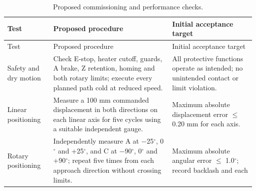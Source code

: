 \documentclass[12pt,a4paper]{article}
\begin{document}
\begingroup
\footnotesize
\setlength{\tabcolsep}{4pt}
\renewcommand{\arraystretch}{1.12}
\begin{longtable}[]{@{}
  >{\raggedright\arraybackslash}p{}
  >{\raggedright\arraybackslash}p{}
  >{\raggedright\arraybackslash}p{}@{}}
\caption{Proposed commissioning and performance checks.}\tabularnewline
\toprule\noalign{}
\begin{minipage}[b]{\linewidth}\raggedright
Test
\end{minipage} & \begin{minipage}[b]{\linewidth}\raggedright
Proposed procedure
\end{minipage} & \begin{minipage}[b]{\linewidth}\raggedright
Initial acceptance target
\end{minipage} \\
\midrule\noalign{}
\endfirsthead
\toprule\noalign{}
\begin{minipage}[b]{\linewidth}\raggedright
Test
\end{minipage} & \begin{minipage}[b]{\linewidth}\raggedright
Proposed procedure
\end{minipage} & \begin{minipage}[b]{\linewidth}\raggedright
Initial acceptance target
\end{minipage} \\
\midrule\noalign{}
\endhead
\bottomrule\noalign{}
\endlastfoot
Safety and dry motion & Check E-stop, heater cutoff, guards, A brake, Z retention, homing and both rotary
  limits; execute every planned path cold at reduced speed. & All protective functions operate as
  intended; no unintended contact or limit violation. \\
Linear positioning & Measure a 100 mm commanded displacement in both directions on each linear axis for
  five cycles using a suitable independent gauge. & Maximum absolute displacement error \ensuremath{\leq}
  0.20 mm for each axis. \\
Rotary positioning & Independently measure A at \ensuremath{-}25\ensuremath{^\circ}, 0\ensuremath{^\circ}
  and +25\ensuremath{^\circ}, and C at \ensuremath{-}90\ensuremath{^\circ}, 0\ensuremath{^\circ} and
  +90\ensuremath{^\circ}; repeat five times from each approach direction without crossing limits. &
  Maximum absolute angular error \ensuremath{\leq} 1.0\ensuremath{^\circ}; record backlash and each

\end{longtable}
\end{document}

